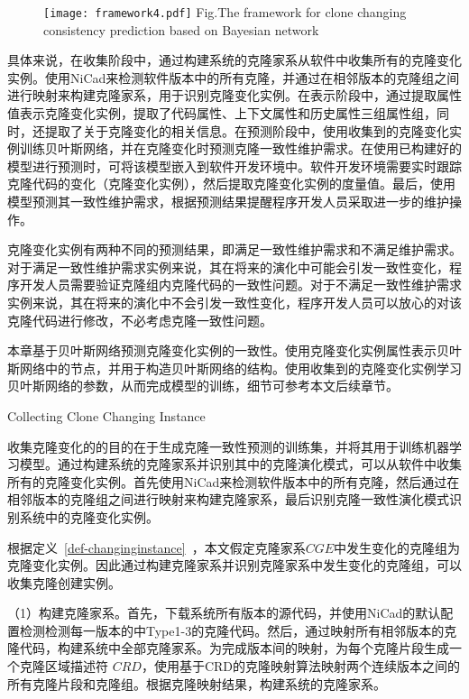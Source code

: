 \begin{figure}[htbp]
\centering
\texttt{[image: framework4.pdf]}
{Fig.$\!$}{The framework for clone changing consistency prediction based on Bayesian network}
\vspace{-1em}
\end{figure}

具体来说，在收集阶段中，通过构建系统的克隆家系从软件中收集所有的克隆变化实例。使用NiCad来检测软件版本中的所有克隆，并通过在相邻版本的克隆组之间进行映射来构建克隆家系，用于识别克隆变化实例。在表示阶段中，通过提取属性值表示克隆变化实例，提取了代码属性、上下文属性和历史属性三组属性组，同时，还提取了关于克隆变化的相关信息。在预测阶段中，使用收集到的克隆变化实例训练贝叶斯网络，并在克隆变化时预测克隆一致性维护需求。在使用已构建好的模型进行预测时，可将该模型嵌入到软件开发环境中。软件开发环境需要实时跟踪克隆代码的变化（克隆变化实例），然后提取克隆变化实例的度量值。最后，使用模型预测其一致性维护需求，根据预测结果提醒程序开发人员采取进一步的维护操作。

克隆变化实例有两种不同的预测结果，即满足一致性维护需求和不满足维护需求。对于满足一致性维护需求实例来说，其在将来的演化中可能会引发一致性变化，程序开发人员需要验证克隆组内克隆代码的一致性问题。对于不满足一致性维护需求实例来说，其在将来的演化中不会引发一致性变化，程序开发人员可以放心的对该克隆代码进行修改，不必考虑克隆一致性问题。

本章基于贝叶斯网络预测克隆变化实例的一致性。使用克隆变化实例属性表示贝叶斯网络中的节点，并用于构造贝叶斯网络的结构。使用收集到的克隆变化实例学习贝叶斯网络的参数，从而完成模型的训练，细节可参考本文后续章节。

{Collecting Clone Changing Instance}

收集克隆变化的的目的在于生成克隆一致性预测的训练集，并将其用于训练机器学习模型。通过构建系统的克隆家系并识别其中的克隆演化模式，可以从软件中收集所有的克隆变化实例。首先使用NiCad来检测软件版本中的所有克隆，然后通过在相邻版本的克隆组之间进行映射来构建克隆家系，最后识别克隆一致性演化模式识别系统中的克隆变化实例。

根据定义~\ref{def-changinginstance}~，本文假定克隆家系$CGE$中发生变化的克隆组为克隆变化实例。因此通过构建克隆家系并识别克隆家系中发生变化的克隆组，可以收集克隆创建实例。

（1）构建克隆家系。首先，下载系统所有版本的源代码，并使用NiCad的默认配置检测检测每一版本的中Type1-3的克隆代码。然后，通过映射所有相邻版本的克隆代码，构建系统中全部克隆家系。为完成版本间的映射，为每个克隆片段生成一个克隆区域描述符 $CRD$\cite{duala2010clone}，使用基于CRD的克隆映射算法映射两个连续版本之间的所有克隆片段和克隆组\cite{ci2013new}\cite{ci2013newD}。根据克隆映射结果，构建系统的克隆家系。

